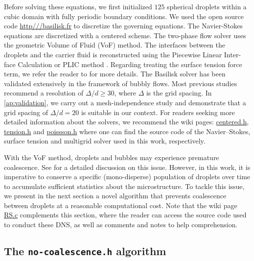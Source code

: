 \documentclass[11pt]{My_preprint}
\providecommand{\DIFadd}[1]{{\protect\color{blue}\uwave{#1}}} %
\providecommand{\DIFdel}[1]{{\protect\color{red}\sout{#1}}}                      %
\providecommand{\DIFaddbegin}{} %
\providecommand{\DIFaddend}{} %
\providecommand{\DIFdelbegin}{} %
\providecommand{\DIFdelend}{} %
\begin{document}
Before solving these equations, we first initialized $125$ spherical droplets within a cubic domain with fully periodic boundary conditions. 
We used the open source code \url{http///basilisk.fr} to discretize the governing equations. 
The Navier-Stokes equations are discretized with a centered scheme.
The two-phase flow solver uses the geometric Volume of Fluid (VoF) method. 
The interfaces between the droplets and the carrier fluid is reconstructed using the Piecewise Linear Inter-face Calculation or PLIC method \citet[Chapter 5.]{tryggvason2011direct}.
Regarding treating the surface tension force term, we refer the reader to \citet{popinet2018numerical} for more details. 
The Basilisk solver has been validated extensively in the framework of bubbly flows. 
Most previous studies \citep{hidman2023assessing,innocenti2020direct} recommend a resolution of \DIFdelbegin \DIFdel{$\Delta/d \ge  30$}\DIFdelend \DIFaddbegin \DIFadd{$d/\Delta \ge  30$}\DIFaddend , where $\Delta$ is the grid spacing. 
In \ref{ap:validation}, we carry out a mesh-independence study and demonstrate that a grid spacing of \DIFdelbegin \DIFdel{$\Delta/d = 20$ }\DIFdelend \DIFaddbegin \DIFadd{$d/\Delta = 25$ }\DIFaddend is suitable in our context.
For readers seeking more detailed information about the solvers, we recommend the wiki pages: \href{http://basilisk.fr/src/navier-stokes/centered.h}{centered.h}, \href{http://basilisk.fr/src/tension.h}{tension.h} and \href{http://basilisk.fr/src/poissson.h}{poissson.h} where one can find the source code of the Navier--Stokes, surface tension and multigrid solver used in this work, respectively. 

With the VoF method, droplets and bubbles may experience premature coalescence.
See \citet[Appendix B]{innocenti2020direct} for a detailed discussion on this issue.
However, in this work, it is imperative to conserve a specific (mono-disperse) population of droplets over time to accumulate sufficient statistics about the microstructure.
To tackle this issue, we present in the next section a novel algorithm that prevents coalescence between droplets at a reasonable computational cost. 
Note that the wiki page \href{http://basilisk.fr/sandbox/fintzin/Rising-suspension/RS.c}{RS.c} complements this section, where the reader can access the source code used to conduct these DNS, as well as comments and notes to help comprehension. 




 \subsection{The \texttt{no-coalescence.h} algorithm}
\end{document}
